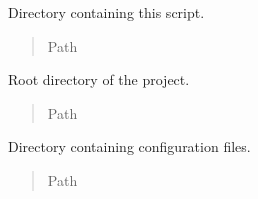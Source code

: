 \documentclass[a4paper,11pt,english,openany,oneside]{sphinxmanual}
\begin{document}
\begin{fulllineitems}
\label{\detokenize{modules/core:core.averager.SCRIPT_DIR}}
\pysigstartsignatures
\pysigline
{}
\pysigstopsignatures
\sphinxAtStartPar
Directory containing this script.
\begin{quote}\begin{description}
\sphinxAtStartPar
Path

\end{description}\end{quote}

\end{fulllineitems}


\begin{fulllineitems}
\label{\detokenize{modules/core:core.averager.PROJECT_ROOT}}
\pysigstartsignatures
\pysigline
{}
\pysigstopsignatures
\sphinxAtStartPar
Root directory of the project.
\begin{quote}\begin{description}
\sphinxAtStartPar
Path

\end{description}\end{quote}

\end{fulllineitems}


\begin{fulllineitems}
\label{\detokenize{modules/core:core.averager.CONFIG_DIR}}
\pysigstartsignatures
\pysigline
{}
\pysigstopsignatures
\sphinxAtStartPar
Directory containing configuration files.
\begin{quote}\begin{description}
\sphinxAtStartPar
Path

\end{description}\end{quote}

\end{fulllineitems}
\end{document}
